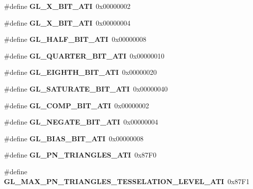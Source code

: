 \begin{DoxyCompactItemize}
\item 
\#define {\bfseries G\+L\+\_\+X\+\_\+\+B\+I\+T\+\_\+\+A\+T\+I}~0x00000002\label{_s_d_l__opengl_8h_a7811821ec70db409ee59fa2a8619e34b}

\item 
\#define {\bfseries G\+L\+\_\+X\+\_\+\+B\+I\+T\+\_\+\+A\+T\+I}~0x00000004\label{_s_d_l__opengl_8h_a5117916e92fe65a48cdb4e8152bf5a69}

\item 
\#define {\bfseries G\+L\+\_\+\+H\+A\+L\+F\+\_\+\+B\+I\+T\+\_\+\+A\+T\+I}~0x00000008\label{_s_d_l__opengl_8h_a83ed6ace9730d728c106bf3175e9977f}

\item 
\#define {\bfseries G\+L\+\_\+\+Q\+U\+A\+R\+T\+E\+R\+\_\+\+B\+I\+T\+\_\+\+A\+T\+I}~0x00000010\label{_s_d_l__opengl_8h_a12c0f3afe4d5db5cea43c0c6c5e3407c}

\item 
\#define {\bfseries G\+L\+\_\+\+E\+I\+G\+H\+T\+H\+\_\+\+B\+I\+T\+\_\+\+A\+T\+I}~0x00000020\label{_s_d_l__opengl_8h_ae67d2042775226d7e8936a1f137ee77c}

\item 
\#define {\bfseries G\+L\+\_\+\+S\+A\+T\+U\+R\+A\+T\+E\+\_\+\+B\+I\+T\+\_\+\+A\+T\+I}~0x00000040\label{_s_d_l__opengl_8h_af9e47a724f3f585781d99712252be9d5}

\item 
\#define {\bfseries G\+L\+\_\+\+C\+O\+M\+P\+\_\+\+B\+I\+T\+\_\+\+A\+T\+I}~0x00000002\label{_s_d_l__opengl_8h_aa923cafb745c3cfc3cd318e284c61540}

\item 
\#define {\bfseries G\+L\+\_\+\+N\+E\+G\+A\+T\+E\+\_\+\+B\+I\+T\+\_\+\+A\+T\+I}~0x00000004\label{_s_d_l__opengl_8h_a8e63ca39bb5fcf6d95f8c4a6e55b7dad}

\item 
\#define {\bfseries G\+L\+\_\+\+B\+I\+A\+S\+\_\+\+B\+I\+T\+\_\+\+A\+T\+I}~0x00000008\label{_s_d_l__opengl_8h_a8db7b7d37460c9b0af022f5318f5702b}

\item 
\#define {\bfseries G\+L\+\_\+\+P\+N\+\_\+\+T\+R\+I\+A\+N\+G\+L\+E\+S\+\_\+\+A\+T\+I}~0x87\+F0\label{_s_d_l__opengl_8h_a31727dc0f01750719bfa5c814f24e33c}

\item 
\#define {\bfseries G\+L\+\_\+\+M\+A\+X\+\_\+\+P\+N\+\_\+\+T\+R\+I\+A\+N\+G\+L\+E\+S\+\_\+\+T\+E\+S\+S\+E\+L\+A\+T\+I\+O\+N\+\_\+\+L\+E\+V\+E\+L\+\_\+\+A\+T\+I}~0x87\+F1\label{_s_d_l__opengl_8h_a52e14ca9f9922e9b735e8513607880fa}


\end{DoxyCompactItemize}
